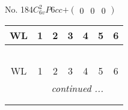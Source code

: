\documentclass[fleqn,9pt,landscape]{jsarticle}
\begin{document}
\newpage
No. 184\quad$C_{6v}^{2}$\quad$P6cc$\quad[ hexagonal ]\quad$+\begin{pmatrix} 0 & 0 & 0 \end{pmatrix}$
\begin{center}
\renewcommand{\arraystretch}{1.2}
\begin{longtable}{ccccccc}
 \hline \hline
WL & 1 & 2 & 3 & 4 & 5 & 6 \\ \hline \endfirsthead

\multicolumn{6}{l}{\tablename\ \thetable{}} \\
 \hline \hline
WL & 1 & 2 & 3 & 4 & 5 & 6 \\ \hline \endhead

 \hline \hline
\multicolumn{6}{r}{\footnotesize\it continued ...} \\ \endfoot

 \hline \hline
\multicolumn{6}{r}{} \\ \endlastfoot


\end{longtable}
\end{center}
\end{document}
